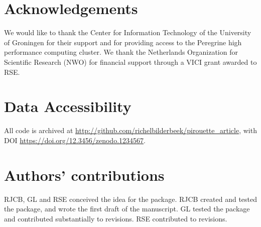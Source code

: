 \documentclass{article}
\begin{document}
\section{Acknowledgements}

We would like to thank the Center for Information Technology of the University 
of Groningen for their support and for providing access to the Peregrine 
high performance computing cluster. 
We thank the Netherlands 
Organization for Scientific Research (NWO) for financial support 
through a VICI grant awarded to RSE.

\section{Data Accessibility}

All code is archived at \url{http://github.com/richelbilderbeek/pirouette_article},
with DOI \url{https://doi.org/12.3456/zenodo.1234567}.

\section{Authors' contributions}

RJCB, GL and RSE conceived the idea for the package. 
RJCB created and tested the package, and wrote the first draft of the manuscript.
GL tested the package and contributed substantially to revisions.
RSE contributed to revisions.



\end{document}
